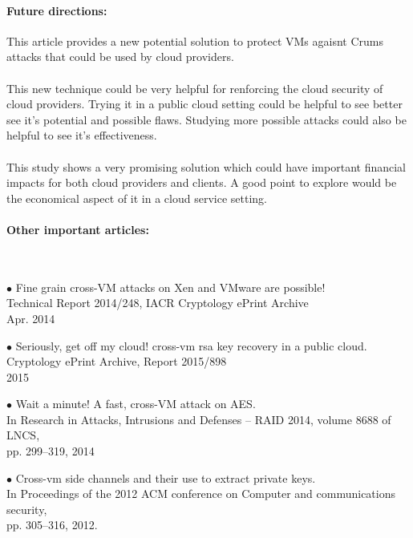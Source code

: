 \documentclass[11pt]{article}
\begin{document}
\paragraph{Future directions:}
This article provides a new potential solution to protect VMs agaisnt Crums attacks that could be used by cloud providers.
\\
\\
This new technique could be very helpful for renforcing the cloud security of cloud providers. Trying it in a public cloud setting could be helpful to see better see it's potential and possible flaws. Studying more possible attacks could also be helpful to see it's effectiveness.
\\
\\
This study shows a very promising solution which could have important financial impacts for both cloud providers and clients. A good point to explore would be the economical aspect of it in a cloud service setting.


\paragraph{Other important articles:}
~\newline
~\newline
\begin{minipage}[t]{1\textwidth}
    \begin{description}
        \item $\bullet$ Fine grain
        cross-VM attacks on Xen and VMware are possible! \\ Technical Report
        2014/248, IACR Cryptology ePrint Archive
        \\ Apr. 2014
        \item $\bullet$ Seriously, get off my cloud! cross-vm rsa key recovery in a public cloud.
        \\ Cryptology ePrint Archive, Report 2015/898
        \\ 2015
        \item $\bullet$ Wait a minute! A
        fast, cross-VM attack on AES. \\ In Research in Attacks, Intrusions and
        Defenses – RAID 2014, volume 8688 of LNCS, \\ pp. 299–319,
        2014
        \item $\bullet$ Cross-vm side
        channels and their use to extract private keys. \\ In Proceedings of the
        2012 ACM conference on Computer and communications security, \\ pp.
        305–316, 2012.
    \end{description}
\end{minipage}
\end{document}
